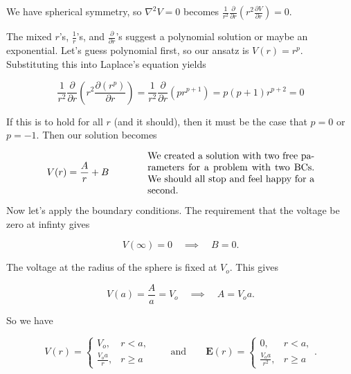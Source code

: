 \documentclass{article}
\begin{document}
We have spherical symmetry, so $\nabla^2 V = 0$ becomes $\displaystyle \frac{1}{r^2} \frac{\partial}{\partial r} \left( r^2 \frac{\partial V}{\partial r} \right) = 0$.

\vspace{1em}

The mixed $r$'s, $\frac{1}{r}$'s, and $\frac{\partial}{\partial r}$'s suggest a polynomial solution or maybe an exponential. Let's guess polynomial first, so our ansatz is $V(r) = r^p$. Substituting this into Laplace's equation yields

\begin{equation*}
    \frac{1}{r^2} \frac{\partial}{\partial r} \left( r^2 \frac{\partial \left( r^p \right)}{\partial r} \right) = \frac{1}{r^2} \frac{\partial}{\partial r} \left( p r^{p+1} \right) = p \left( p + 1 \right) r^{p+2} = 0
\end{equation*}

If this is to hold for all $r$ (and it should), then it must be the case that $p = 0$ or $p = -1$. Then our solution becomes

\begin{equation*}
    V(r) = \frac{A}{r} + B \qquad\qquad \parbox[c]{0.5\textwidth}{We created a solution with two free parameters for a problem with two BCs. We should all stop and feel happy for a second.}
\end{equation*}

Now let's apply the boundary conditions. The requirement that the voltage be zero at infinty gives

\begin{equation*}
    V(\infty) = 0 \quad \implies \quad B = 0.
\end{equation*}

The voltage at the radius of the sphere is fixed at $V_o$. This gives

\begin{equation*}
    V(a) = \frac{A}{a} = V_o \quad \implies \quad A = V_o a. 
\end{equation*}

So we have

\begin{equation*}
    V(r) = \begin{cases} V_o, & r < a, \\[1em] \frac{V_o a}{r}, & r \geqslant a \end{cases} \qquad \text{and} \qquad \bm{E}(r) = \begin{cases} 0, & r < a, \\[1em] \frac{V_o a}{r^2}, & r \geqslant a \end{cases}.
\end{equation*}
\end{document}
